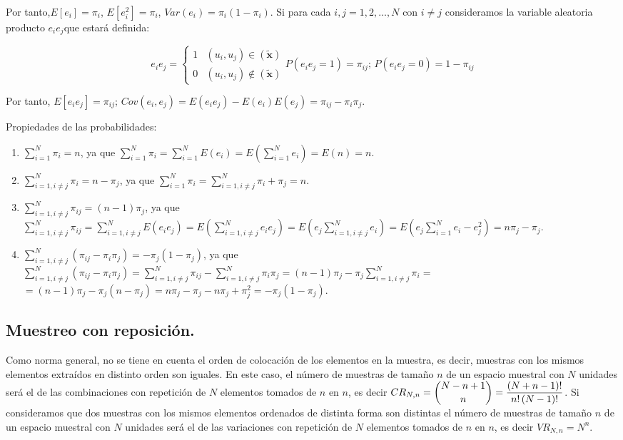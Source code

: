 Por tanto,$E\left[e_{i}\right]=\pi_{i}$, $E\left[e_{i}^{2}\right]=\pi_{i}$,
$Var\left(e_{i}\right)=\pi_{i}\left(1-\pi_{i}\right)$. Si para cada
$i,j=1,2,\ldots,N$ con $i\neq j$ consideramos la variable aleatoria
producto $e_{i}e_{j}$que estar\'a definida:

\[
e_{i}e_{j}=\begin{cases}
1 & \left(u_{i},u_{j}\right)\in\left(\widetilde{\boldsymbol{x}}\right)\\
0 & \left(u_{i},u_{j}\right)\notin\left(\widetilde{\boldsymbol{x}}\right)
\end{cases}P\left(e_{i}e_{j}=1\right)=\pi_{ij};\,P\left(e_{i}e_{j}=0\right)=1-\pi_{ij}
\]


Por tanto, $E\left[e_{i}e_{j}\right]=\pi_{ij}$; $Cov\left(e_{i},e_{j}\right)=E\left(e_{i}e_{j}\right)-E\left(e_{i}\right)E\left(e_{j}\right)=\pi_{ij}-\pi_{i}\pi_{j}$.

Propiedades de las probabilidades:
\begin{enumerate}
\item $\sum_{i=1}^{N}\pi_{i}=n$, ya que $\sum_{i=1}^{N}\pi_{i}=\sum_{i=1}^{N}E\left(e_{i}\right)=E\left(\sum_{i=1}^{N}e_{i}\right)=E\left(n\right)=n$.
\item $\sum_{i=1,i\neq j}^{N}\pi_{i}=n-\pi_{j}$, ya que $\sum_{i=1}^{N}\pi_{i}=\sum_{i=1,i\neq j}^{N}\pi_{i}+\pi_{j}=n$.
\item $\sum_{i=1,i\neq j}^{N}\pi_{ij}=\left(n-1\right)\pi_{j}$, ya que
$\sum_{i=1,i\neq j}^{N}\pi_{ij}=\sum_{i=1,i\neq j}^{N}E\left(e_{i}e_{j}\right)=E\left(\sum_{i=1,i\neq j}^{N}e_{i}e_{j}\right)=E\left(e_{j}\sum_{i=1,i\neq j}^{N}e_{i}\right)=E\left(e_{j}\sum_{i=1}^{N}e_{i}-e_{j}^{2}\right)=n\pi_{j}-\pi_{j}$.
\item $\sum_{i=1,i\neq j}^{N}\left(\pi_{ij}-\pi_{i}\pi_{j}\right)=-\pi_{j}\left(1-\pi_{j}\right)$,
ya que $\sum_{i=1,i\neq j}^{N}\left(\pi_{ij}-\pi_{i}\pi_{j}\right)=\sum_{i=1,i\neq j}^{N}\pi_{ij}-\sum_{i=1,i\neq j}^{N}\pi_{i}\pi_{j}=\left(n-1\right)\pi_{j}-\pi_{j}\sum_{i=1,i\neq j}^{N}\pi_{i}=$
$=\left(n-1\right)\pi_{j}-\pi_{j}\left(n-\pi_{j}\right)=n\pi_{j}-\pi_{j}-n\pi_{j}+\pi_{j}^{2}=-\pi_{j}\left(1-\pi_{j}\right)$.
\end{enumerate}

\subsection{Muestreo con reposici\'on.}

Como norma general, no se tiene en cuenta el orden de colocaci\'on de
los elementos en la muestra, es decir, muestras con los mismos elementos
extra\'idos en distinto orden son iguales. En este caso, el n\'umero de
muestras de tama\~no $n$ de un espacio muestral con $N$ unidades ser\'a
el de las combinaciones con repetici\'on de $N$ elementos tomados de
$n$ en $n$, es decir $CR_{N,n}=\dbinom{N-n+1}{n}=\dfrac{\left(N+n-1\right)!}{n!\left(N-1\right)!}$.
Si consideramos que dos muestras con los mismos elementos ordenados
de distinta forma son distintas el n\'umero de muestras de tama\~no $n$
de un espacio muestral con $N$ unidades ser\'a el de las variaciones
con repetici\'on de $N$ elementos tomados de $n$ en $n$, es decir
$VR_{N,n}=N^{n}$.

